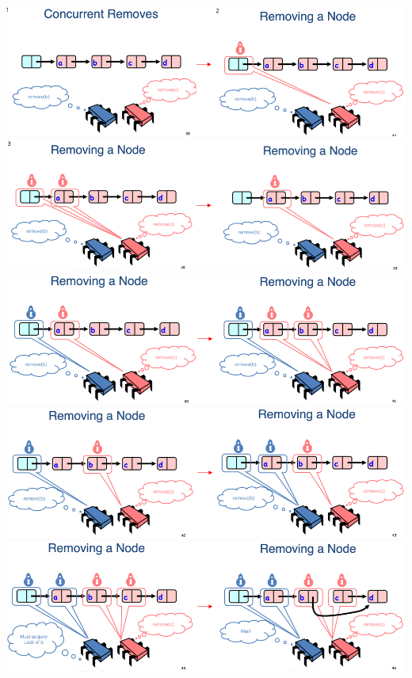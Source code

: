 \documentclass[12pt]{article}
\begin{document}
\begin{enumerate}[1.]
\begin{enumerate}[a)]
\begin{itemize}
\begin{itemize}
                \bigskip

                \begin{center}
                \includegraphics[width=\linewidth]{../images/midterm_3_solution_3.png}
                \includegraphics[width=\linewidth]{../images/midterm_3_solution_4.png}
                \includegraphics[width=\linewidth]{../images/midterm_3_solution_5.png}
                \includegraphics[width=\linewidth]{../images/midterm_3_solution_6.png}
                \includegraphics[width=\linewidth]{../images/midterm_3_solution_7.png}

\end{center}
\end{itemize}
\end{itemize}
\end{enumerate}
\end{enumerate}
\end{document}
